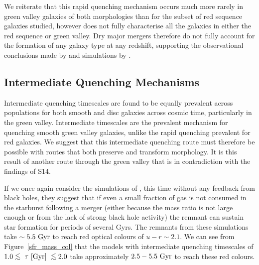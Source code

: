 We reiterate that this rapid quenching mechanism occurs much more rarely in green valley galaxies of both morphologies than for the subset of red sequence galaxies studied, however does not fully characterise all the galaxies in either the red sequence or green valley. Dry major mergers therefore do not fully account for the formation of any galaxy type at any redshift, supporting the observational conclusions made by \citet{Bell07,Bundy07, kaviraj14a} and simulations by \citet{Genel08}. 

\subsection{Intermediate Quenching Mechanisms}\label{int}

Intermediate quenching timescales are found to be equally prevalent across populations for both smooth and disc galaxies across cosmic time,  particularly in the green valley. Intermediate timescales are the prevalent mechanism for quenching smooth green valley galaxies, unlike the rapid quenching prevalent for red galaxies. We suggest that this intermediate quenching route must therefore be possible with routes that both preserve and transform morphology. It is this result of another route through the green valley that is in contradiction with the findings of S14. 

If we once again consider the simulations of \citet{springel05b}, this time without any feedback from black holes, they suggest that if even a small fraction of gas is not consumed in the starburst following a merger (either because the mass ratio is not large enough or from the lack of strong black hole activity) the remnant can sustain star formation for periods of several Gyrs. The remnants from these simulations take $\sim5.5~\rm{Gyr}$ to reach red optical colours of $u-r \sim 2.1$. We can see from Figure~\ref{sfr_mass_col} that the models with intermediate quenching timescales of $1.0 \lesssim ~\tau~\rm{[Gyr]} ~\lesssim 2.0$ take approximately $2.5-5.5~\rm{Gyr}$ to reach these red colours.

